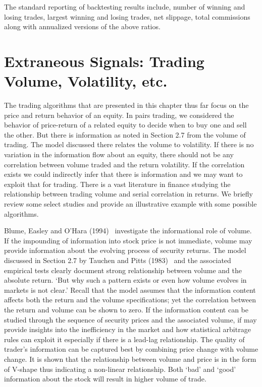 The standard reporting of backtesting results include, number of winning and losing trades, largest winning and losing trades, net slippage, total commissions along with annualized versions of the above ratios. 


\section{Extraneous Signals: Trading Volume, Volatility, etc.}


The trading algorithms that are presented in this chapter thus far focus on the price and return behavior of an equity. In pairs trading, we considered the behavior of price-return of a related equity to decide when to buy one and sell the other. But there is information as noted in Section 2.7 from the volume of trading. The model discussed there relates the volume to volatility. If there is no variation in the information flow about an equity, there should not be any correlation between volume traded and the return volatility. If the correlation exists we could indirectly infer that there is information and we may want to exploit that for trading. There is a vast literature in finance studying the relationship between trading volume and serial correlation in returns. We briefly review some select studies and provide an illustrative example with some possible algorithms. 


Blume, Easley and O'Hara (1994)~\cite{blumeohar} investigate the informational role of volume. If the impounding of information into stock price is not immediate, volume may provide information about the evolving process of security returns. The model discussed in Section 2.7 by Tauchen and Pitts (1983)~\cite{tauchenpitts} and the associated empirical tests clearly document strong relationship between volume and the absolute return. `But why such a pattern exists or even how volume evolves in markets is not clear.' Recall that the model assumes that the information content affects both the return and the volume specifications; yet the correlation between the return and volume can be shown to zero. If the information content can be studied through the sequence of security prices and the associated volume, if may provide insights into the inefficiency in the market and how statistical arbitrage rules can exploit it especially if there is a lead-lag relationship. The quality of trader's information can be captured best by combining price change with volume change. It is shown that the relationship between volume and price is in the form of V-shape thus indicating a non-linear relationship. Both `bad' and `good' information about the stock will result in higher volume of trade. 


